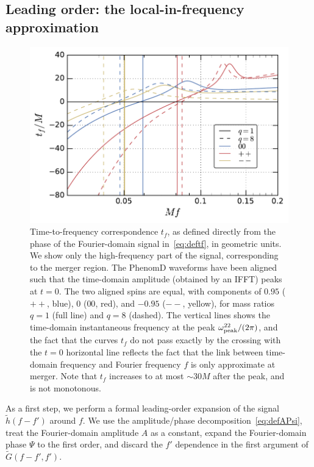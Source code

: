 \documentclass[aps,showpacs,twocolumn,
prd,superscriptaddress,nofootinbib]{revtex4-1}
\begin{document}

\subsection{Leading order: the local-in-frequency approximation}
\label{subsec:LLP}

\begin{figure}
  \centering
  \includegraphics[width=.98\linewidth]{plots/tf_py.pdf}
  \caption{Time-to-frequency correspondence $t_{f}$, as defined directly from the phase of the Fourier-domain signal in~\eqref{eq:deftf}, in geometric units. We show only the high-frequency part of the signal, corresponding to the merger region. The PhenomD waveforms have been aligned such that the time-domain amplitude (obtained by an IFFT) peaks at $t=0$. The two aligned spins are equal, with components of $0.95$ ($++$, blue), $0$ ($00$, red), and $-0.95$ ($--$, yellow), for mass ratios $q=1$ (full line) and $q=8$ (dashed). The vertical lines shows the time-domain instantaneous frequency at the peak $\omega^{22}_{\rm peak}/(2\pi)$, and the fact that the curves $t_{f}$ do not pass exactly by the crossing with the $t=0$ horizontal line reflects the fact that the link between time-domain frequency and Fourier frequency $f$ is only approximate at merger. Note that $t_{f}$ increases to at most $\sim 30M$ after the peak, and is not monotonous.}
  \label{fig:tf}
\end{figure}

As a first step, we perform a formal leading-order expansion of the signal $\tilde{h}(f-f')$ around $f$. We use the amplitude/phase decomposition~\eqref{eq:defAPsi}, treat the Fourier-domain amplitude $A$ as a constant, expand the Fourier-domain phase $\Psi$ to the first order, and discard the $f'$ dependence in the first argument of $\tilde{G}(f-f', f')$.
\end{document}
